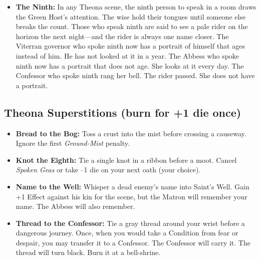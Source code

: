 \begin{itemize}
  \item \textbf{The Ninth:} In any Theona scene, the ninth person to speak in a room draws the Green Host's attention. The wise hold their tongues until someone else breaks the count. Those who speak ninth are said to see a pale rider on the horizon the next night---and the rider is always one name closer. The Viterran governor who spoke ninth now has a portrait of himself that ages instead of him. He has not looked at it in a year. The Abbess who spoke ninth now has a portrait that does not age. She looks at it every day. The Confessor who spoke ninth rang her bell. The rider passed. She does not have a portrait.
\end{itemize}

\subsection*{Theona Superstitions (burn for +1 die once)}
\begin{itemize}
  \item \textbf{Bread to the Bog:} Toss a crust into the mist before crossing a causeway. Ignore the first \emph{Ground-Mist} penalty.
  \item \textbf{Knot the Eighth:} Tie a single knot in a ribbon before a moot. Cancel \emph{Spoken Geas} or take --1 die on your next oath (your choice).
  \item \textbf{Name to the Well:} Whisper a dead enemy's name into Saint's Well. Gain +1 Effect against his kin for the scene, but the Matron will remember your name. The Abbess will also remember.
  \item \textbf{Thread to the Confessor:} Tie a gray thread around your wrist before a dangerous journey. Once, when you would take a Condition from fear or despair, you may transfer it to a Confessor. The Confessor will carry it. The thread will turn black. Burn it at a bell-shrine.
\end{itemize}

